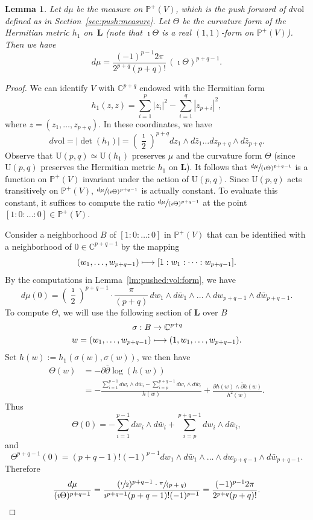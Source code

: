 \documentclass[JEP,XML,SOM,Unicode]{cedram}
\newcommand\mto{\mathchoice{\longmapsto}{\mapsto}{\mapsto}{\mapsto}}
\theoremstyle{plain}
\newtheorem{Lemma}[Theorem]{Lemma}
\theoremstyle{definition}
\def\C{\mathbb{C}}
\newcommand{\Pb}{\mathbb{P}}
\newcommand{\Lb}{\mathbf{L}}
\newcommand{\vol}{\mathrm{vol}}
\newcommand{\Ur}{\mathrm{U}}
\begin{document}
\begin{Lemma}\label{lm:vol:form:chern:curv}
Let $d\mu$ be the measure on $\Pb^+(V)$, which is the push forward of $d\vol$ defined as in Section~\ref{sec:push:measure}.
Let $\Theta$ be the curvature form of the Hermitian metric $h_1$ on~$\Lb$ (note that $\imath\Theta$ is a real $(1,1)$-form on $\Pb^+(V)$).
Then we have
\[
d\mu=\frac{(-1)^{p-1}2\pi}{2^{p+q}(p+q)!}\,(\imath\Theta)^{p+q-1}.
\]
\end{Lemma}
\begin{proof}
We can identify $V$ with $\C^{p+q}$ endowed with the Hermitian form
\[
h_1(z,z)=\sum_{i=1}^p |z_i|^2-\sum_{i=1}^q |z_{p+i}|^2,
\]
where $z=(z_1,\dots,z_{p+q})$. In these coordinates, we have
\[
d\vol=|{\det}(h_1)|=\left(\frac{\imath}{2}\right)^{p+q}dz_1\wedge d\bar{z}_1\dots dz_{p+q}\wedge d\bar{z}_{p+q}.
\]
Observe that $\Ur(p,q)\simeq \Ur(h_1)$ preserves $\mu$ and the curvature form $\Theta$ (since $\Ur(p,q)$ preserves the Hermitian metric $h_1$ on $\Lb$).
It follows that $\sfrac{d\mu}{(\imath\Theta)^{p+q-1}}$ is a function on $\Pb^+(V)$ invariant under the action of $\Ur(p,q)$.
Since $\Ur(p,q)$ acts transitively on $\Pb^+(V)$, $\sfrac{d\mu}{(\imath\Theta)^{p+q-1}}$ is actually constant.
To evaluate this constant, it suffices to compute the ratio $\sfrac{d\mu}{(\imath\Theta)^{p+q-1}}$ at the point $[1:0:\dots:0] \in \Pb^+(V)$.

Consider a neighborhood $B$ of $[1:0:\dots:0]$ in $\Pb^+(V)$ that can be identified with a neighborhood of $0\in \C^{p+q-1}$ by the mapping
\[
(w_1,\dots,w_{p+q-1}) \mto [1:w_1:\dots:w_{p+q-1}].
\]
By the computations in Lemma~\ref{lm:pushed:vol:form}, we have
\[
d\mu(0)=\left(\frac{\imath}{2}\right)^{p+q-1}\cdot\frac{\pi}{(p+q)}\,dw_1\wedge d\bar{w}_1\wedge\dots\wedge dw_{p+q-1}\wedge d\bar{w}_{p+q-1}.
\]
To compute $\Theta$, we will use the following section of $\Lb$ over $B$
\begin{align*}
\sigma: B & \to  \C^{p+q} \\
 w=(w_1,\dots,w_{p+q-1}) & \mto  (1,w_1,\dots,w_{p+q-1}).
\end{align*}
Set $h(w):=h_1(\sigma(w),\sigma(w))$, we then have
\begin{align*}
\Theta(w) &=  -\partial\bar{\partial}\log(h(w)) \\
& = -\frac{\sum_{i=1}^{p-1}dw_i\wedge d\bar{w}_i-\sum_{i=p}^{p+q-1}dw_i\wedge d\bar{w}_i}{h(w)} + \frac{\partial h(w)\wedge\bar{\partial}h(w)}{h^2(w)}.
\end{align*}
Thus
\[
\Theta(0)=-\sum_{i=1}^{p-1}dw_i\wedge d\bar{w}_i+\sum_{i=p}^{p+q-1}dw_i \wedge d\bar{w}_i,
\]
and
\[
\Theta^{p+q-1}(0)=(p+q-1)!(-1)^{p-1}dw_1\wedge d\bar{w}_1\wedge\dots\wedge dw_{p+q-1}\wedge d\bar{w}_{p+q-1}.
\]
Therefore
\[
\frac{d\mu}{(\imath\Theta)^{p+q-1}}= \frac{(\sfrac{\imath}{2})^{p+q-1}\cdot\sfrac{\pi}{(p+q)}}{\imath^{p+q-1} (p+q-1)!(-1)^{p-1}} = \frac{(-1)^{p-1}2\pi}{2^{p+q}(p+q)!}.\qedhere
\]
\end{proof}
\end{document}

